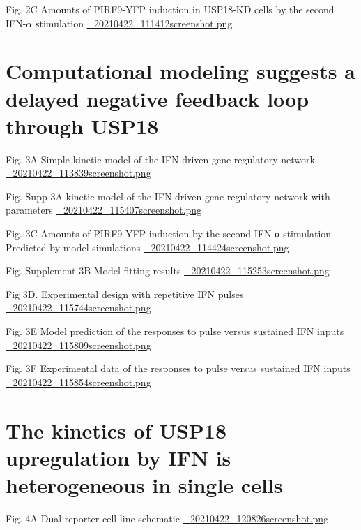 \documentclass[bigger]{beamer}
\begin{document}
\begin{frame}[label={sec:org21a7a6e}]{Fig. 2C Amounts of PIRF9-YFP induction in USP18-KD cells by the second IFN-\(\alpha\) stimulation}
\url{\_20210422\_111412screenshot.png}
\end{frame}

\section{Computational modeling suggests a delayed negative feedback loop through USP18}
\label{sec:orge40d00a}
\begin{frame}[label={sec:org65d0844}]{Fig. 3A Simple kinetic model of the IFN-driven gene regulatory network}
\url{\_20210422\_113839screenshot.png}
\end{frame}

\begin{frame}[label={sec:org6a2c454}]{Fig. Supp 3A kinetic model of the IFN-driven gene regulatory network with parameters}
\url{\_20210422\_115407screenshot.png}
\end{frame}

\begin{frame}[label={sec:org1319d70}]{Fig. 3C Amounts of PIRF9-YFP induction by the second IFN-α stimulation Predicted by model simulations}
\url{\_20210422\_114424screenshot.png}
\end{frame}


\begin{frame}[label={sec:org1bebcec}]{Fig. Supplement 3B Model fitting results}
\url{\_20210422\_115253screenshot.png}
\end{frame}

\begin{frame}[label={sec:org46c32b4}]{Fig 3D. Experimental design with repetitive IFN pulses}
\url{\_20210422\_115744screenshot.png}
\end{frame}


\begin{frame}[label={sec:org2f895b8}]{Fig. 3E Model prediction of the responses to pulse versus sustained IFN inputs}
\url{\_20210422\_115809screenshot.png}
\end{frame}

\begin{frame}[label={sec:org78c48f6}]{Fig. 3F Experimental data of the responses to pulse versus sustained IFN inputs}
\url{\_20210422\_115854screenshot.png}
\end{frame}

\section{The kinetics of USP18 upregulation by IFN is heterogeneous in single cells}
\label{sec:orgaeb453c}
\begin{frame}[label={sec:orgea592ff}]{Fig. 4A Dual reporter cell line schematic}
\url{\_20210422\_120826screenshot.png}
\end{frame}
\end{document}
